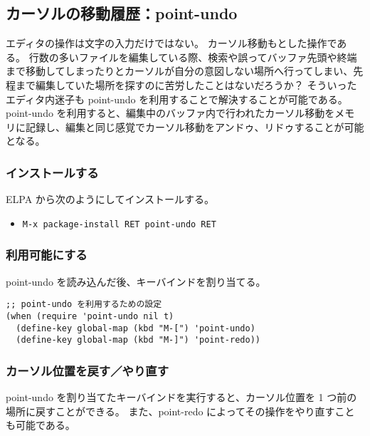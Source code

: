 \subsection{カーソルの移動履歴：point-undo}
エディタの操作は文字の入力だけではない。
カーソル移動もとした操作である。
行数の多いファイルを編集している際、検索や誤ってバッファ先頭や終端まで移動してしまったりとカーソルが自分の意図しない場所へ行ってしまい、先程まで編集していた場所を探すのに苦労したことはないだろうか？
そういったエディタ内迷子も point-undo を利用することで解決することが可能である。
point-undo を利用すると、編集中のバッファ内で行われたカーソル移動をメモリに記録し、編集と同じ感覚でカーソル移動をアンドゥ、リドゥすることが可能となる。
\subsubsection{インストールする}
ELPA から次のようにしてインストールする。
\begin{itemize}\setlength{\leftskip}{-1.00zw}%
\item[] \texttt{M-x package-install RET point-undo RET}
\end{itemize}
\subsubsection{利用可能にする}
point-undo を読み込んだ後、キーバインドを割り当てる。
\begin{mdframed}[roundcorner=0.50zw,leftmargin=3.00zw,rightmargin=3.00zw,skipabove=0.40zw,skipbelow=0.40zw,innertopmargin=4.00pt,innerbottommargin=4.00pt,innerleftmargin=5.00pt,innerrightmargin=5.00pt,linecolor=gray!020,linewidth=0.50pt,backgroundcolor=gray!20]
\begin{verbatim}
;; point-undo を利用するための設定
(when (require 'point-undo nil t)
  (define-key global-map (kbd "M-[") 'point-undo)
  (define-key global-map (kbd "M-]") 'point-redo))
\end{verbatim}
\end{mdframed}
\subsubsection{カーソル位置を戻す／やり直す}
point-undo を割り当てたキーバインドを実行すると、カーソル位置を 1 つ前の場所に戻すことができる。
また、point-redo によってその操作をやり直すことも可能である。
